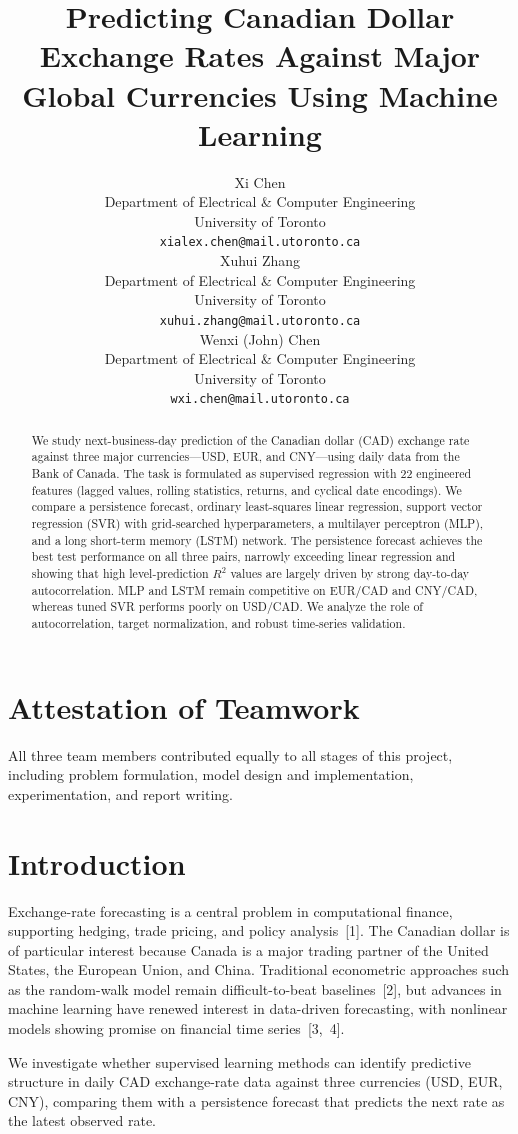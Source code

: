 \documentclass{article}
\title{Predicting Canadian Dollar Exchange Rates Against Major Global Currencies Using Machine Learning}
\author{%
  Xi Chen\\
  Department of Electrical \& Computer Engineering\\
  University of Toronto\\
  \texttt{xialex.chen@mail.utoronto.ca} \\
  \And
  Xuhui Zhang\\
  Department of Electrical \& Computer Engineering\\
  University of Toronto\\
  \texttt{xuhui.zhang@mail.utoronto.ca} \\
  \And
  Wenxi (John) Chen\\
  Department of Electrical \& Computer Engineering\\
  University of Toronto\\
  \texttt{wxi.chen@mail.utoronto.ca} \\
}
\begin{document}
\maketitle


\begin{abstract}
We study next-business-day prediction of the Canadian dollar (CAD) exchange rate against three major currencies---USD, EUR, and CNY---using daily data from the Bank of Canada. The task is formulated as supervised regression with 22 engineered features (lagged values, rolling statistics, returns, and cyclical date encodings). We compare a persistence forecast, ordinary least-squares linear regression, support vector regression (SVR) with grid-searched hyperparameters, a multilayer perceptron (MLP), and a long short-term memory (LSTM) network. The persistence forecast achieves the best test performance on all three pairs, narrowly exceeding linear regression and showing that high level-prediction $R^2$ values are largely driven by strong day-to-day autocorrelation. MLP and LSTM remain competitive on EUR/CAD and CNY/CAD, whereas tuned SVR performs poorly on USD/CAD. We analyze the role of autocorrelation, target normalization, and robust time-series validation.
\end{abstract}

\section*{Attestation of Teamwork}
All three team members contributed equally to all stages of this project, including problem formulation, model design and implementation, experimentation, and report writing.


\section{Introduction}

Exchange-rate forecasting is a central problem in computational finance, supporting hedging, trade pricing, and policy analysis~[1]. The Canadian dollar is of particular interest because Canada is a major trading partner of the United States, the European Union, and China. Traditional econometric approaches such as the random-walk model remain difficult-to-beat baselines~[2], but advances in machine learning have renewed interest in data-driven forecasting, with nonlinear models showing promise on financial time series~[3,~4].

We investigate whether supervised learning methods can identify predictive structure in daily CAD exchange-rate data against three currencies (USD, EUR, CNY), comparing them with a persistence forecast that predicts the next rate as the latest observed rate.
\end{document}
